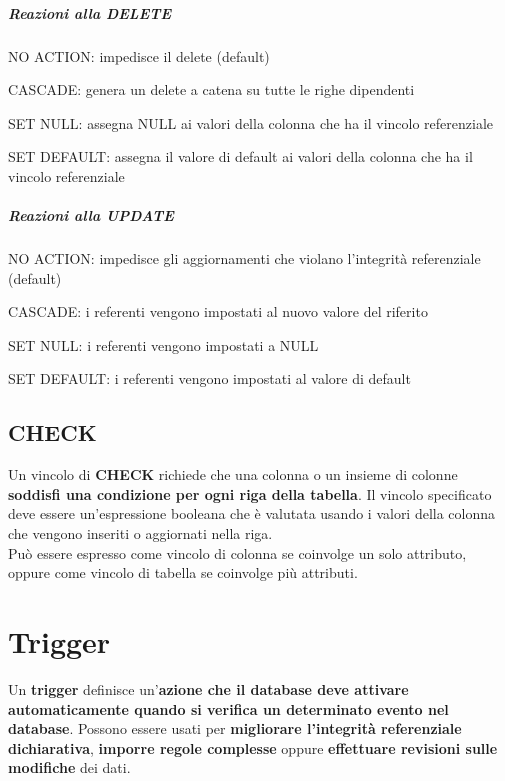 \documentclass[10pt]{book}
\begin{document}
\paragraph{Reazioni alla DELETE}\begin{list}{}{}
	\item NO ACTION: impedisce il delete (default)
	\item CASCADE: genera un delete a catena su tutte le righe dipendenti
	\item SET NULL: assegna NULL ai valori della colonna che ha il vincolo referenziale
	\item SET DEFAULT: assegna il valore di default ai valori della colonna che ha il vincolo referenziale
\end{list}
\paragraph{Reazioni alla UPDATE}\begin{list}{}{}
	\item NO ACTION: impedisce gli aggiornamenti che violano l'integrità referenziale (default)
	\item CASCADE: i referenti vengono impostati al nuovo valore del riferito
	\item SET NULL: i referenti vengono impostati a NULL
	\item SET DEFAULT: i referenti vengono impostati al valore di default
\end{list}
\section{CHECK}
Un vincolo di \textbf{CHECK} richiede che una colonna o un insieme di colonne \textbf{soddisfi una condizione per ogni riga della tabella}. Il vincolo specificato deve essere un'espressione booleana che è valutata usando i valori della colonna che vengono inseriti o aggiornati nella riga.\\
Può essere espresso come vincolo di colonna se coinvolge un solo attributo, oppure come vincolo di tabella se coinvolge più attributi.
\chapter{Trigger}
Un \textbf{trigger} definisce un'\textbf{azione che il database deve attivare automaticamente quando si verifica un determinato evento nel database}. Possono essere usati per \textbf{migliorare l'integrità referenziale dichiarativa}, \textbf{imporre regole complesse} oppure \textbf{effettuare revisioni sulle modifiche} dei dati.
\end{document}
